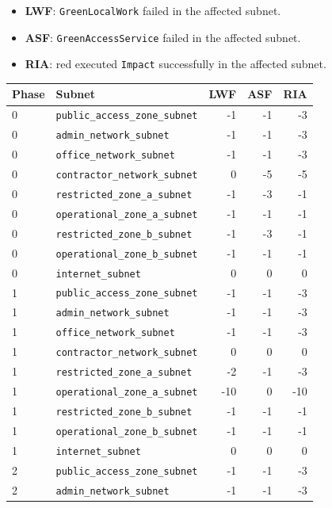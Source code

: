 \begin{itemize}
  \item \textbf{LWF}: \texttt{GreenLocalWork} failed in the affected subnet.
  \item \textbf{ASF}: \texttt{GreenAccessService} failed in the affected subnet.
  \item \textbf{RIA}: red executed \texttt{Impact} successfully in the affected subnet.
\end{itemize}

\begin{longtable}{llrrr}
\toprule
\textbf{Phase} & \textbf{Subnet} & \textbf{LWF} & \textbf{ASF} & \textbf{RIA} \\
\midrule
0 & \texttt{public\_access\_zone\_subnet} & -1 & -1 & -3 \\
0 & \texttt{admin\_network\_subnet} & -1 & -1 & -3 \\
0 & \texttt{office\_network\_subnet} & -1 & -1 & -3 \\
0 & \texttt{contractor\_network\_subnet} & 0 & -5 & -5 \\
0 & \texttt{restricted\_zone\_a\_subnet} & -1 & -3 & -1 \\
0 & \texttt{operational\_zone\_a\_subnet} & -1 & -1 & -1 \\
0 & \texttt{restricted\_zone\_b\_subnet} & -1 & -3 & -1 \\
0 & \texttt{operational\_zone\_b\_subnet} & -1 & -1 & -1 \\
0 & \texttt{internet\_subnet} & 0 & 0 & 0 \\
\midrule
1 & \texttt{public\_access\_zone\_subnet} & -1 & -1 & -3 \\
1 & \texttt{admin\_network\_subnet} & -1 & -1 & -3 \\
1 & \texttt{office\_network\_subnet} & -1 & -1 & -3 \\
1 & \texttt{contractor\_network\_subnet} & 0 & 0 & 0 \\
1 & \texttt{restricted\_zone\_a\_subnet} & -2 & -1 & -3 \\
1 & \texttt{operational\_zone\_a\_subnet} & -10 & 0 & -10 \\
1 & \texttt{restricted\_zone\_b\_subnet} & -1 & -1 & -1 \\
1 & \texttt{operational\_zone\_b\_subnet} & -1 & -1 & -1 \\
1 & \texttt{internet\_subnet} & 0 & 0 & 0 \\
\midrule
2 & \texttt{public\_access\_zone\_subnet} & -1 & -1 & -3 \\
2 & \texttt{admin\_network\_subnet} & -1 & -1 & -3 \\

\end{longtable}
